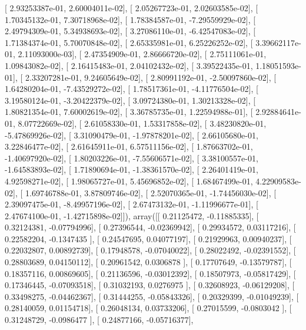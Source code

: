 \documentclass{article}
\begin{document}
       [ 2.93253387e-01,  2.60004011e-02],
       [ 2.05267723e-01,  2.02603585e-02],
       [ 1.70345132e-01,  7.30718968e-02],
       [ 1.78384587e-01, -7.29559929e-02],
       [ 2.49794309e-01,  5.34938693e-02],
       [ 3.27086110e-01, -6.42547083e-02],
       [ 1.71384374e-01,  5.70070848e-02],
       [ 2.65335981e-01,  6.25226252e-02],
       [ 3.39662117e-01,  2.11093000e-03],
       [ 2.47354909e-01,  2.86666720e-02],
       [ 2.75111061e-01,  1.09843082e-02],
       [ 2.16415483e-01,  2.04102432e-02],
       [ 3.39522435e-01,  1.18051593e-01],
       [ 2.33207281e-01,  9.24605649e-02],
       [ 2.80991192e-01, -2.50097860e-02],
       [ 1.64280204e-01, -7.43529272e-02],
       [ 1.78517361e-01, -4.11776504e-02],
       [ 3.19580124e-01, -3.20422379e-02],
       [ 3.09724380e-01,  1.30213328e-02],
       [ 1.80821354e-01,  7.60002619e-02],
       [ 3.36785735e-01,  1.22594988e-01],
       [ 2.92884641e-01,  8.07722669e-02],
       [ 2.61058330e-01,  1.53317858e-02],
       [ 3.48230820e-01, -5.47869926e-02],
       [ 3.31090479e-01, -1.97878201e-02],
       [ 2.66105680e-01,  3.22846477e-02],
       [ 2.61645911e-01,  6.57511156e-02],
       [ 1.87663702e-01, -1.40697920e-02],
       [ 1.80203226e-01, -7.55606571e-02],
       [ 3.38100557e-01, -1.64583893e-02],
       [ 1.71890694e-01, -1.38361570e-02],
       [ 2.26401419e-01,  4.92598271e-02],
       [ 1.98065727e-01,  5.45696852e-02],
       [ 1.68467499e-01,  4.22909583e-02],
       [ 1.69746788e-01,  3.87809746e-02],
       [ 2.52070365e-01, -1.74456030e-02],
       [ 2.39097475e-01, -8.49957196e-02],
       [ 2.67473132e-01, -1.11996677e-01],
       [ 2.47674100e-01, -1.42715898e-02]]), array([[ 0.21125472, -0.11885335],
       [ 0.32124381, -0.07794996],
       [ 0.27396544, -0.02369942],
       [ 0.29934572,  0.03117216],
       [ 0.22582204, -0.1347435 ],
       [ 0.24547695,  0.04077197],
       [ 0.21929963,  0.00940237],
       [ 0.22032807,  0.00892739],
       [ 0.17948578, -0.07040022],
       [ 0.28022492, -0.02391552],
       [ 0.28803689,  0.04150112],
       [ 0.20961542,  0.0306878 ],
       [ 0.17707649, -0.13579787],
       [ 0.18357116,  0.00869605],
       [ 0.21136596, -0.03012392],
       [ 0.18507973, -0.05817429],
       [ 0.17346445, -0.07093518],
       [ 0.31032193,  0.0276975 ],
       [ 0.32608923, -0.06129208],
       [ 0.33498275, -0.04462367],
       [ 0.31444255, -0.05843326],
       [ 0.20329399, -0.01049239],
       [ 0.28140059,  0.01154718],
       [ 0.26048134,  0.03733206],
       [ 0.27015599, -0.0803042 ],
       [ 0.31248729, -0.0986477 ],
       [ 0.24877166, -0.05716377],
\end{document}
